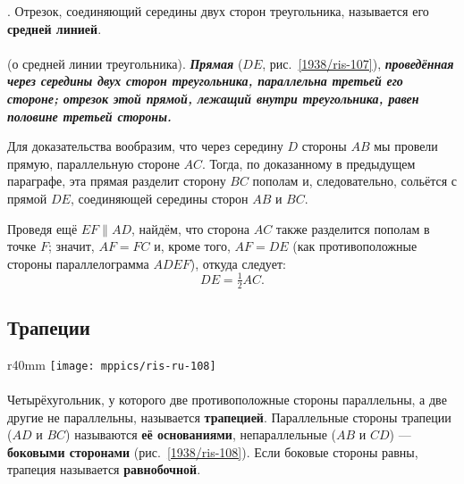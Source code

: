 \smallskip
\mbox{.}
Отрезок, соединяющий середины двух сторон треугольника, называется его \textbf{средней линией}.

\paragraph{}\label{1938/97}
 (о средней линии треугольника).
\textbf{\emph{Прямая}} ($DE$, рис.~\ref{1938/ris-107}), \textbf{\emph{проведённая через середины двух сторон треугольника, параллельна третьей его стороне;
отрезок этой прямой, лежащий внутри треугольника, равен половине третьей стороны.}}

Для доказательства вообразим, что через середину $D$ стороны $AB$ мы провели прямую, параллельную стороне $AC$.
Тогда, по доказанному в предыдущем параграфе, эта прямая разделит сторону $BC$ пополам и, следовательно, сольётся с прямой $DE$, соединяющей середины сторон $AB$ и $BC$.

Проведя ещё $EF \parallel AD$, найдём, что сторона $AC$ также разделится пополам в точке $F$;
значит, $AF=FC$ и, кроме того, $AF=DE$
(как противоположные стороны параллелограмма $ADEF$), откуда следует:
\[DE=\tfrac12AC.\]

\renewcommand{\bottomtitlespace}{.11\textheight}%

\subsection*{Трапеции}

\begin{wrapfigure}{r}{40mm}
\vskip-0mm
\centering
\texttt{[image: mppics/ris-ru-108]}
\caption{}\label{1938/ris-108}
\end{wrapfigure}
\paragraph{}\label{1938/98}

Четырёхугольник, у которого две противоположные стороны параллельны, а две другие не параллельны, называется \textbf{трапецией}.
Параллельные стороны трапеции ($AD$ и $BC$) называются \textbf{её основаниями}, непараллельные ($AB$ и $CD$) — \textbf{боковыми сторонами} (рис.~\ref{1938/ris-108}).
Если боковые стороны равны, трапеция называется \textbf{равнобочной}.

